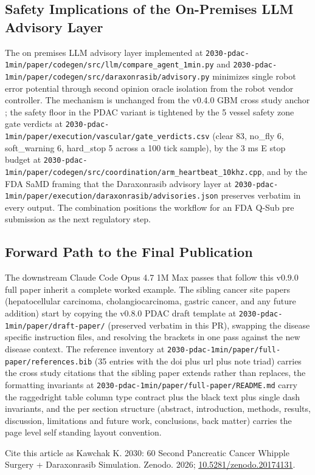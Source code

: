 \subsection{Safety Implications of the On-Premises LLM Advisory Layer}
\label{sec:conclusions-safety}

The on premises LLM advisory layer implemented at
\texttt{2030-pdac-1min/paper/codegen/src/llm/compare_agent_1min.py}
and
\texttt{2030-pdac-1min/paper/codegen/src/daraxonrasib/advisory.py}
minimizes single robot error potential through second opinion
oracle isolation from the robot vendor controller. The mechanism
is unchanged from the v0.4.0 GBM cross study anchor
\cite{kawchak_2026_20113157}; the safety floor in the PDAC
variant is tightened by the 5 vessel safety zone gate verdicts at
\texttt{2030-pdac-1min/paper/execution/vascular/gate_verdicts.csv}
(clear 83, no_fly 6, soft_warning 6, hard_stop 5 across a 100
tick sample), by the 3 ms E stop budget at
\texttt{2030-pdac-1min/paper/codegen/src/coordination/arm_heartbeat_10khz.cpp},
and by the FDA SaMD framing \cite{fda-samd} that the Daraxonrasib
advisory layer at
\texttt{2030-pdac-1min/paper/execution/daraxonrasib/advisories.json}
preserves verbatim in every output. The combination positions the
workflow for an FDA Q-Sub pre submission as the next regulatory
step.

\subsection{Forward Path to the Final Publication}
\label{sec:conclusions-forward}

The downstream Claude Code Opus 4.7 1M Max passes that follow
this v0.9.0 full paper inherit a complete worked example. The
sibling cancer site papers (hepatocellular carcinoma,
cholangiocarcinoma, gastric cancer, and any future addition)
start by copying the v0.8.0 PDAC draft template at
\texttt{2030-pdac-1min/paper/draft-paper/} (preserved verbatim in
this PR), swapping the disease specific instruction files, and
resolving the brackets in one pass against the new disease
context. The reference inventory at
\texttt{2030-pdac-1min/paper/full-paper/references.bib} (35
entries with the doi plus url plus note triad) carries the cross
study citations that the sibling paper extends rather than
replaces, the formatting invariants at
\texttt{2030-pdac-1min/paper/full-paper/README.md} carry the
raggedright table column type contract plus the black text plus
single dash invariants, and the per section structure (abstract,
introduction, methods, results, discussion, limitations and
future work, conclusions, back matter) carries the page level
self standing layout convention.

Cite this article as Kawchak K. 2030: 60 Second Pancreatic Cancer
Whipple Surgery + Daraxonrasib Simulation. Zenodo. 2026;
\href{https://doi.org/10.5281/zenodo.20174131}{10.5281/zenodo.20174131}.
